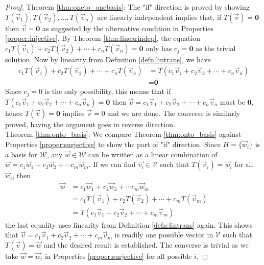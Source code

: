 \begin{proof}
Theorem \ref{thm:oneto_onebasis}: The "if" direction is proved by showing $T(\vec{v}_1), T(\vec{v}_2), \ldots, T(\vec{v}_n)$ are linearly independent implies that, if $T(\vec{v}) = \textbf{0}$ then $\vec{v} = \textbf{0}$ as suggested by the alternative condition in Properties \ref{proper:injective}. By Theorem \ref{thm:linearindep}, the equation $c_1T(\vec{v}_1) + c_2T(\vec{v}_2) + \cdots + c_nT(\vec{v}_n) = \textbf{0}$ only has $c_j = \textbf{0}$ as the trivial solution. Now by linearity from Definition \ref{defn:lintrans}, we have
\begin{align*}
c_1T(\vec{v}_1) + c_2T(\vec{v}_2) + \cdots + c_nT(\vec{v}_n) &= T(c_1\vec{v}_1 + c_2\vec{v}_2 + \cdots + c_n\vec{v}_n) \\
&= \textbf{0}    
\end{align*}
Since $c_j = 0$ is the only possibility, this means that if $T(c_1\vec{v}_1 + c_2\vec{v}_2 + \cdots + c_n\vec{v}_n) = \textbf{0}$ then $\vec{v} = c_1\vec{v}_1 + c_2\vec{v}_2 + \cdots + c_n\vec{v}_n$ must be $\textbf{0}$, hence $T(\vec{v}) = \textbf{0}$ implies $\vec{v} = 0$ and we are done. The converse is similarly proved,  having the argument goes in reverse direction. \\
Theorem \ref{thm:onto_basis}: We compare Theorem \ref{thm:onto_basis} against Properties \ref{proper:surjective} to show the part of "if" direction. Since $H = \{\vec{w}_i\}$ is a basis for $\mathcal{W}$, any $\vec{w} \in \mathcal{W}$ can be written as a linear combination of $\vec{w} = c_1\vec{w}_1 + c_2\vec{w}_2 + \cdots c_m\vec{w}_m$. If we can find $\vec{v_i} \in \mathcal{V}$ such that $T(\vec{v}_i) = \vec{w}_i$ for all $\vec{w}_i$, then
\begin{align*}
\vec{w} &= c_1\vec{w}_1 + c_2\vec{w}_2 + \cdots c_m\vec{w}_m \\
&= c_1T(\vec{v}_1) + c_2T(\vec{v}_2) + \cdots + c_mT(\vec{v}_m) \\
&= T(c_1\vec{v}_1 + c_2\vec{v}_2 + \cdots + c_m\vec{v}_m)
\end{align*}
the last equality uses linearity from Definition \ref{defn:lintrans} again. This shows that $\vec{v} = c_1\vec{v}_1 + c_2\vec{v}_2 + \cdots + c_m\vec{v}_m$ is readily one possible vector in $\mathcal{V}$ such that $T(\vec{v}) = \vec{w}$ and the desired result is established. The converse is trivial as we take $\vec{w} = \vec{w}_i$ in Properties \ref{proper:surjective} for all possible $i$.
\end{proof}


